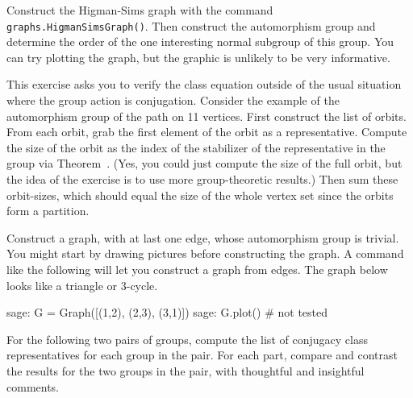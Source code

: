 \begin{sageverbatim}\end{sageverbatim}
%
%
Construct the Higman-Sims graph with the command \verb?graphs.HigmanSimsGraph()?.  Then construct the automorphism group and determine the order of the one interesting normal subgroup of this group.  You can try plotting the graph, but the graphic is unlikely to be very informative.
\begin{sageverbatim}\end{sageverbatim}
%
%
This exercise asks you to verify the class equation outside of the usual situation where the group action is conjugation.  Consider the example of the automorphism group of the path on 11 vertices.  First construct the list of orbits.  From each orbit, grab the first element of the orbit as a representative.  Compute the size of the orbit as the index of the stabilizer of the representative in the group via Theorem~.  (Yes, you could just compute the size of the full orbit, but the idea of the exercise is to use more group-theoretic results.)  Then sum these orbit-sizes, which should equal the size of the whole vertex set since the orbits form a partition.
\begin{sageverbatim}\end{sageverbatim}
%
%
Construct a graph, with at last one edge, whose automorphism group is trivial.  You might start by drawing pictures before constructing the graph.  A command like the following will let you construct a graph from edges.  The graph below looks like a triangle or $3$-cycle.
%
\begin{sageexample}
sage: G = Graph([(1,2), (2,3), (3,1)])
sage: G.plot()            # not tested
\end{sageexample}
%
\begin{sageverbatim}\end{sageverbatim}
%
%
For the following two pairs of groups, compute the list of conjugacy class representatives for each group in the pair.  For each part, compare and contrast the results for the two groups in the pair, with thoughtful and insightful comments.\\
